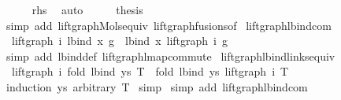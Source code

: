 \begin{isabellebody}
\ \ \ \ \isamarkupfalse%
\ rhs\ \isamarkupfalse%
\ auto\isanewline
\isanewline
\ \ \isamarkupfalse%
\ \isamarkupfalse%
\ {\isacharquery}{\kern0pt}thesis\isanewline
\ \ \ \ \isamarkupfalse%
\ {\isacharparenleft}{\kern0pt}simp\ add{\isacharcolon}{\kern0pt}\ lift{\isacharunderscore}{\kern0pt}graph{\isacharunderscore}{\kern0pt}Mols{}{\isacharunderscore}{\kern0pt}equiv\ lift{\isacharunderscore}{\kern0pt}graph{\isacharunderscore}{\kern0pt}fusions{\isacharunderscore}{\kern0pt}of{\isacharparenright}{\kern0pt}\isanewline
{}\isamarkupfalse%
%
\endisatagproof
{\isafoldproof}%
%
\isadelimproof
\isanewline
%
\endisadelimproof
\isanewline
\isanewline
{}\isamarkupfalse%
\ lift{\isacharunderscore}{\kern0pt}graph{\isacharunderscore}{\kern0pt}lbind{\isacharunderscore}{\kern0pt}com{\isacharcolon}{\kern0pt}\isanewline
\ \ {\isachardoublequoteopen}lift{\isacharunderscore}{\kern0pt}graph\ i\ {\isacharparenleft}{\kern0pt}lbind\ x\ g{\isacharparenright}{\kern0pt}\ {\isacharequal}{\kern0pt}\ lbind\ x\ {\isacharparenleft}{\kern0pt}lift{\isacharunderscore}{\kern0pt}graph\ i\ g{\isacharparenright}{\kern0pt}{\isachardoublequoteclose}\isanewline
%
\isadelimproof
%
\endisadelimproof
%
\isatagproof
{}\isamarkupfalse%
\ {\isacharparenleft}{\kern0pt}simp\ add{\isacharcolon}{\kern0pt}\ lbind{\isacharunderscore}{\kern0pt}def\ lift{\isacharunderscore}{\kern0pt}graph{\isacharunderscore}{\kern0pt}lmap{\isacharunderscore}{\kern0pt}commute{\isacharparenright}{\kern0pt}%
\endisatagproof
{\isafoldproof}%
%
\isadelimproof
\isanewline
%
\endisadelimproof
\isanewline
\isanewline
{}\isamarkupfalse%
\ lift{\isacharunderscore}{\kern0pt}graph{\isacharunderscore}{\kern0pt}lbind{\isacharunderscore}{\kern0pt}links{\isacharunderscore}{\kern0pt}equiv{\isacharcolon}{\kern0pt}\isanewline
\ \ {\isachardoublequoteopen}lift{\isacharunderscore}{\kern0pt}graph\ i\ {\isacharparenleft}{\kern0pt}fold\ lbind\ ys\ T{\isacharparenright}{\kern0pt}\ {\isacharequal}{\kern0pt}\ fold\ lbind\ ys\ {\isacharparenleft}{\kern0pt}lift{\isacharunderscore}{\kern0pt}graph\ i\ T{\isacharparenright}{\kern0pt}{\isachardoublequoteclose}\isanewline
%
\isadelimproof
%
\endisadelimproof
%
\isatagproof
{}\isamarkupfalse%
\ {\isacharparenleft}{\kern0pt}induction\ ys\ arbitrary{\isacharcolon}{\kern0pt}\ T{\isacharparenright}{\kern0pt}\isanewline
{}\isamarkupfalse%
\ simp\isanewline
{}\isamarkupfalse%
\ {\isacharparenleft}{\kern0pt}simp\ add{\isacharcolon}{\kern0pt}\ lift{\isacharunderscore}{\kern0pt}graph{\isacharunderscore}{\kern0pt}lbind{\isacharunderscore}{\kern0pt}com{\isacharparenright}{\kern0pt}%

\end{isabellebody}
